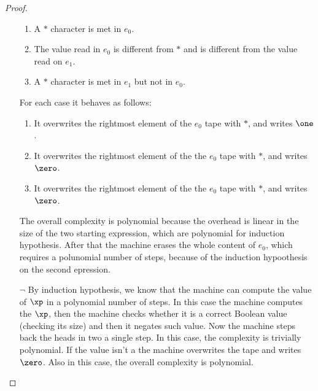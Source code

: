 \begin{proof}
\begin{itemize}
\begin{enumerate}
\item A $*$ character is met in $e_0$.
\item The value read in $e_0$ is different from $*$ and is different from the value read on $e_1$.
\item A $*$ character is met in $e_1$ but not in $e_0$.
\end{enumerate}
For each case it behaves as follows:
\begin{enumerate}
\item It overwrites the rightmost element of the $e_0$ tape with $*$, and writes $\one$.
\item It overwrites the rightmost element of the the $e_0$ tape with $*$, and writes $\zero$.
\item It overwrites the rightmost element of the the $e_0$ tape with $*$, and writes $\zero$.
\end{enumerate}
The overall complexity is polynomial because the overhead is linear in the size of the two starting expression, which are polynomial for induction hypothesis. After that the machine erases the whole content of $e_0$, which requires a polunomial number of steps, because of the induction hypoothesis on the second epression.
\item[$\lnot$] By induction hypothesis, we know that the machine can compute the value of $\xp$ in a polynomial number of steps. In this case the machine computes the $\xp$, then the machine checks whether it is a correct Boolean value (checking its size) and then it negates such value. Now the machine steps back the heads in two a single step. In this case, the complexity is trivially polynomial. If the value isn't a the machine overwrites the tape and writes $\zero$. Also in this case, the overall complexity is polynomial.

\end{itemize}
\end{proof}
